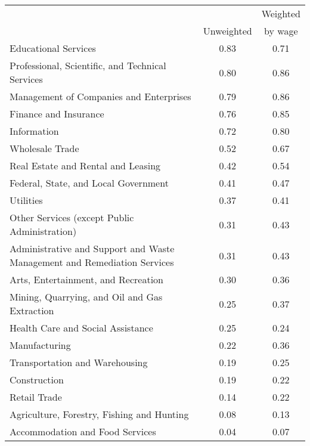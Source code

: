 \begin{tabular}{lcc} \toprule
&&Weighted\\
& Unweighted & by wage\\
\midrule
Educational Services&0.83&0.71\\
Professional, Scientific, and Technical Services&0.80&0.86\\
Management of Companies and Enterprises&0.79&0.86\\
Finance and Insurance&0.76&0.85\\
Information&0.72&0.80\\
Wholesale Trade&0.52&0.67\\
Real Estate and Rental and Leasing&0.42&0.54\\
Federal, State, and Local Government&0.41&0.47\\
Utilities&0.37&0.41\\
Other Services (except Public Administration)&0.31&0.43\\
Administrative and Support and Waste Management and Remediation Services&0.31&0.43\\
Arts, Entertainment, and Recreation&0.30&0.36\\
Mining, Quarrying, and Oil and Gas Extraction&0.25&0.37\\
Health Care and Social Assistance&0.25&0.24\\
Manufacturing&0.22&0.36\\
Transportation and Warehousing&0.19&0.25\\
Construction&0.19&0.22\\
Retail Trade&0.14&0.22\\
Agriculture, Forestry, Fishing and Hunting&0.08&0.13\\
Accommodation and Food Services&0.04&0.07\\
\bottomrule \end{tabular}
